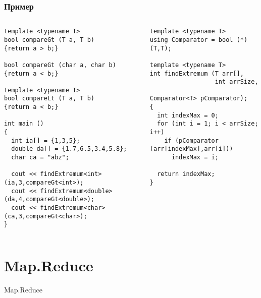 \documentclass{beamer}
\begin{document}
\begin{frame}[fragile]
\frametitle{Пример}



\begin{columns}[t]
  \begin{column}{0.55\textwidth}
\begin{flushleft}
\begin{lstlisting}
template <typename T>
bool compareGt (T a, T b) 
{return a > b;}

bool compareGt (char a, char b) 
{return a < b;}

template <typename T>
bool compareLt (T a, T b) 
{return a < b;}

int main ()
{
  int ia[] = {1,3,5};
  double da[] = {1.7,6.5,3.4,5.8};
  char ca = "abz";

  cout << findExtremum<int> (ia,3,compareGt<int>);
  cout << findExtremum<double> (da,4,compareGt<double>);
  cout << findExtremum<char> (ca,3,compareGt<char>);
}

\end{lstlisting}  
\end{flushleft}
  \end{column}
  \begin{column}{0.45\textwidth}
\begin{flushleft}
\begin{lstlisting}
template <typename T>
using Comparator = bool (*)(T,T);

template <typename T>
int findExtremum (T arr[], 
                  int arrSize, 
                  Comparator<T> pComparator);
{
  int indexMax = 0;
  for (int i = 1; i < arrSize; i++)
    if (pComparator (arr[indexMax],arr[i]))
      indexMax = i;

  return indexMax;
}
\end{lstlisting}  
\end{flushleft}
  \end{column}
\end{columns}
  
\end{frame}




\section{Map.Reduce} 

\begin{frame}
\centerline{Map.Reduce}
\end{frame}
\end{document}
